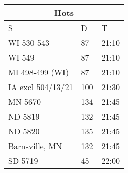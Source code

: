 \documentclass{article}
\begin{document}
\fontsize{32}{38}\selectfont
\centering
\begin{tabular}{@{}lll@{}}
\multicolumn{3}{c}{\textbf{Hots}}                                          \\ 
\toprule
S                 & D   & T     \\ \midrule
WI 530-543        & 87  & 21:10 \\
WI 549            & 87  & 21:10 \\
MI 498-499 (WI)   & 87  & 21:10 \\
IA excl 504/13/21 & 100 & 21:30 \\
MN 5670           & 134 & 21:45 \\
ND 5819           & 132 & 21:45 \\
ND 5820           & 135 & 21:45 \\
Barnsville, MN    & 132 & 21:45 \\
SD 5719           & 45  & 22:00 \\ \bottomrule
\end{tabular}
\end{document}
